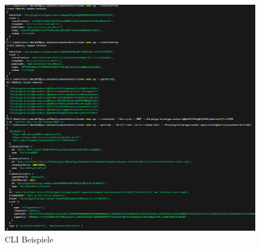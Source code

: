 \begin{itemize}
	\begin{figure}[t]
		\centering
		\includegraphics[scale=0.7]{media/CLI}
		\caption{CLI Beispiele}
		\label{fig:CLI}
	\end{figure}
	

\end{itemize}

